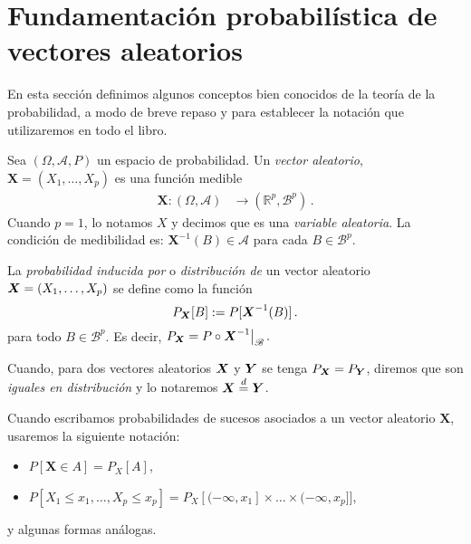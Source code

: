 \section{Fundamentación probabilística de vectores aleatorios}

En esta sección definimos algunos conceptos bien conocidos de la teoría de la probabilidad,
a modo de breve repaso y para establecer la notación que utilizaremos en todo el libro.


\begin{ndef}
    Sea $(\Omega, \mathscr{A}, P)$ un espacio de probabilidad. Un \emph{vector aleatorio}, $\boldsymbol X = (X_1, \dots, X_p)$ es una función medible
    \begin{align*}
      \boldsymbol X:(\Omega, \mathscr{A}) &\rightarrow (\mathbb{R}^p, \mathscr{B}^p)\,.
    \end{align*}
     Cuando $p=1$, lo notamos $X$ y decimos que es una \emph{variable aleatoria}.
    La condición de medibilidad es: \(\boldsymbol X^{-1}(B) \in \mathscr{A}\) para cada \( B \in \mathscr{B}^p\).
\end{ndef}



\begin{ndef}
    La \emph{probabilidad inducida por} o \emph{distribución de} un vector aleatorio $\boldsymbol{X} = (X_1, \dots, X_p)$ se define como la función
    \[
    P_{\boldsymbol{X}}[B] := P[\boldsymbol X^{-1}(B)]\,.\] para todo \(B \in \mathscr{B}^p\). Es decir, $P_{\vectX} = P \circ \restr{\boldsymbol X^{-1}}{\mathscr{B}}\,.$
\end{ndef}

\begin{ndef}
  Cuando, para dos vectores aleatorios $\boldsymbol{X}$ y $\boldsymbol{Y}$ se tenga $P_{\boldsymbol{X}} = P_{\boldsymbol{Y}}$, diremos que
  son \emph{iguales en distribución} y lo notaremos $\boldsymbol{X} \stackrel{d}{=} \boldsymbol{Y}$.
\end{ndef}

\begin{notacion}
  Cuando escribamos probabilidades de sucesos asociados a un vector aleatorio $\boldsymbol X$, usaremos la siguiente notación:
  \begin{itemize}
  \item $P[\boldsymbol X \in A] = P_X[A]$,
  \item $P[X_1 \le x_1, \dots, X_p \le x_p] = P_X[(-\infty, x_1]\times \dots \times (-\infty, x_p]]$,
  \end{itemize}
  y algunas formas análogas.
\end{notacion}

